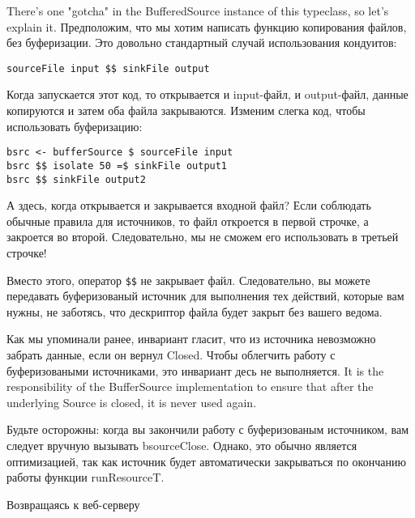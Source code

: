 There's one "gotcha" in the BufferedSource instance of this typeclass, so
let's explain it. Предположим, что мы хотим написать функцию копирования файлов, без буферизации. Это довольно стандартный случай использования кондуитов:
\begin{lstlisting}
sourceFile input $$ sinkFile output
\end{lstlisting}
Когда запускается этот код, то открывается и input-файл, и output-файл, данные копируются и затем оба файла закрываются. Изменим слегка код, чтобы использовать буферизацию:
\begin{lstlisting}
bsrc <- bufferSource $ sourceFile input
bsrc $$ isolate 50 =$ sinkFile output1
bsrc $$ sinkFile output2
\end{lstlisting}
А здесь, когда открывается и закрывается входной файл? Если соблюдать обычные правила для источников, то файл откроется в первой строчке, а закроется во второй. Следовательно, мы не сможем его использовать в третьей строчке!

Вместо этого, оператор \verb#$$# не закрывает файл. Следовательно, вы можете передавать буферизованый источник для выполнения тех действий, которые вам нужны, не заботясь, что дескриптор файла будет закрыт без вашего ведома.

Как мы упоминали ранее, инвариант гласит, что из источника невозможно забрать данные, если он вернул Closed. Чтобы облегчить работу с буферизоваными источниками, это инвариант десь не выполняется. It is the responsibility of
the BufferSource implementation to ensure that after the underlying
Source is closed, it is never used again.

Будьте осторожны: когда вы закончили работу с буферизованым источником, вам следует вручную вызывать bsourceClose. Однако, это обычно является оптимизацией, так как источник будет автоматически закрываться по окончанию работы функции runResourceT.

Возвращаясь к веб-серверу

